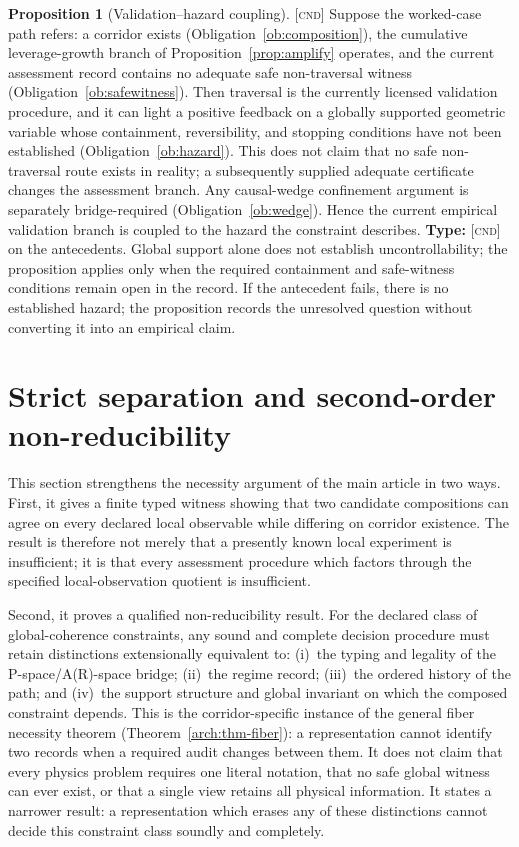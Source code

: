 \documentclass[11pt]{article}
\newcommand{\Cnd}{\textsc{[cnd]}}
\theoremstyle{definition}
\newtheorem{sproposition}{Proposition}
\begin{document}
\begin{sproposition}[Validation--hazard coupling]\label{prop:coupling-supp}
\Cnd{} Suppose the worked-case path refers: a corridor exists
(Obligation~\ref{ob:composition}), the cumulative leverage-growth branch of
Proposition~\ref{prop:amplify} operates, and the current assessment record contains
no adequate safe non-traversal witness (Obligation~\ref{ob:safewitness}). Then
traversal is the currently licensed validation procedure, and it can light a
positive feedback on a globally supported geometric variable whose containment,
reversibility, and stopping conditions have not been established
(Obligation~\ref{ob:hazard}). This does not claim that no safe non-traversal route
exists in reality; a subsequently supplied adequate certificate changes the
assessment branch. Any causal-wedge confinement argument is separately
bridge-required (Obligation~\ref{ob:wedge}). Hence the current empirical
validation branch is coupled to the hazard the constraint describes. \textbf{Type:}
\Cnd{} on the antecedents. Global support alone does not establish
uncontrollability; the proposition applies only when the required containment and
safe-witness conditions remain open in the record. If the antecedent fails, there
is no established hazard; the proposition records the unresolved question without
converting it into an empirical claim.
\end{sproposition}


\section{Strict separation and second-order non-reducibility}
\label{supp:strict-separation}

This section strengthens the necessity argument of the main article in two
ways. First, it gives a finite typed witness showing that two candidate
compositions can agree on every declared local observable while differing on
corridor existence. The result is therefore not merely that a presently known
local experiment is insufficient; it is that every assessment procedure which
factors through the specified local-observation quotient is insufficient.

Second, it proves a qualified non-reducibility result. For the declared class of
global-coherence constraints, any sound and complete decision procedure must
retain distinctions extensionally equivalent to: (i)~the typing and legality of
the P-space/A(R)-space bridge; (ii)~the regime record; (iii)~the ordered history
of the path; and (iv)~the support structure and global invariant on which the
composed constraint depends. This is the corridor-specific instance of the general
fiber necessity theorem (Theorem~\ref{arch:thm-fiber}): a representation cannot
identify two records when a required audit changes between them. It does not claim
that every physics problem requires one literal notation, that no safe global
witness can ever exist, or that a single view retains all physical information. It
states a narrower result: a representation which erases any of these distinctions
cannot decide this constraint class soundly and completely.
\end{document}
